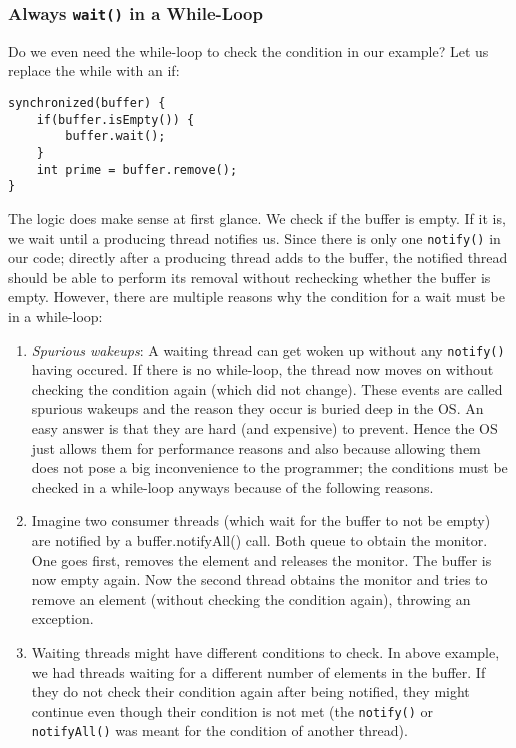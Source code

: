 \documentclass[main.tex]{subfiles}
\begin{document}
\subsubsection{Always \texttt{wait()} in a While-Loop}
Do we even need the while-loop to check the condition in our example? Let us replace the while with an if:
\begin{verbatim}
synchronized(buffer) {
    if(buffer.isEmpty()) {
        buffer.wait();
    }
    int prime = buffer.remove();
}
\end{verbatim}
The logic does make sense at first glance. We check if the buffer is empty. If it is, we wait until a producing thread notifies us. Since there is only one \texttt{notify()} in our code; directly after a producing thread adds to the buffer, the notified thread should be able to perform its removal without rechecking whether the buffer is empty. However, there are multiple reasons why the condition for a wait must be in a while-loop:
\begin{enumerate}
    \item \textit{Spurious wakeups}: A waiting thread can get woken up without any \texttt{notify()} having occured. If there is no while-loop, the thread now moves on without checking the condition again (which did not change). These events are called spurious wakeups and the reason they occur is buried deep in the OS. An easy answer is that they are hard (and expensive) to prevent. Hence the OS just allows them for performance reasons and also because allowing them does not pose a big inconvenience to the programmer; the conditions must be checked in a while-loop anyways because of the following reasons.
    \item Imagine two consumer threads (which wait for the buffer to not be empty) are notified by a buffer.notifyAll() call. Both queue to obtain the monitor. One goes first, removes the element and releases the monitor. The buffer is now empty again. Now the second thread obtains the monitor and tries to remove an element (without checking the condition again), throwing an exception.
    \item Waiting threads might have different conditions to check. In above example, we had threads waiting for a different number of elements in the buffer. If they do not check their condition again after being notified, they might continue even though their condition is not met (the \texttt{notify()} or \texttt{notifyAll()} was meant for the condition of another thread).
\end{enumerate}
\end{document}
